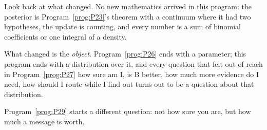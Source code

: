 \begin{fr}
Look back at what changed. No new mathematics arrived in this program: the
posterior is Program~\ref{prog:P23}'s theorem with a continuum where it had two
hypotheses, the update is counting, and every number is a sum of binomial
coefficients or one integral of a density.

What changed is the \emph{object}. Program~\ref{prog:P26} ends with a
parameter; this program ends with a distribution over it, and every question
that felt out of reach in Program~\ref{prog:P27} \dash{} how sure am I, is B
better, how much more evidence do I need, how should I route while I find out
\dash{} turns out to be a question about that distribution.

Program~\ref{prog:P29} starts a different question: not how sure you are, but
how much a message is worth.
\end{fr}

